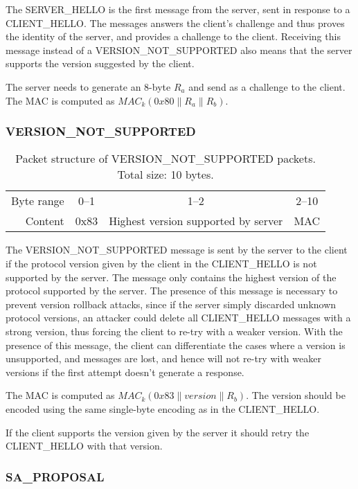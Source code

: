 The SERVER\_HELLO is the first message from the server, sent in response to a CLIENT\_HELLO. The messages answers the client's challenge and thus proves the identity of the server, and provides a challenge to the client. Receiving this message instead of a VERSION\_NOT\_SUPPORTED also means that the server supports the version suggested by the client.

The server needs to generate an 8-byte \( R_a \) and send as a challenge to the client. The MAC is computed as \( MAC_k(0x80 \| R_a \| R_b) \).


        \subsubsection{VERSION\_NOT\_SUPPORTED}

\begin{table}[ht!]
\centering
    \begin{tabular}{r | c | c | c |}
    \cline{2-4}
    Byte range & 0--1 & 1--2 & 2--10 \\ \cline{2-4}
    Content & 0x83 & Highest version supported by server & MAC \\ \cline{2-4}
    \end{tabular}
    \caption{Packet structure of VERSION\_NOT\_SUPPORTED packets. Total size: 10 bytes.}
\end{table}

The VERSION\_NOT\_SUPPORTED message is sent by the server to the client if the protocol version given by the client in the CLIENT\_HELLO is not supported by the server. The message only contains the highest version of the protocol supported by the server. The presence of this message is necessary to prevent version rollback attacks, since if the server simply discarded unknown protocol versions, an attacker could delete all CLIENT\_HELLO messages with a strong version, thus forcing the client to re-try with a weaker version. With the presence of this message, the client can differentiate the cases where a version is unsupported, and messages are lost, and hence will not re-try with weaker versions if the first attempt doesn't generate a response.

The MAC is computed as \( MAC_k(0x83 \| version \| R_b) \). The version should be encoded using the same single-byte encoding as in the CLIENT\_HELLO.

If the client supports the version given by the server it should retry the CLIENT\_HELLO with that version.


        \subsubsection{SA\_PROPOSAL}

